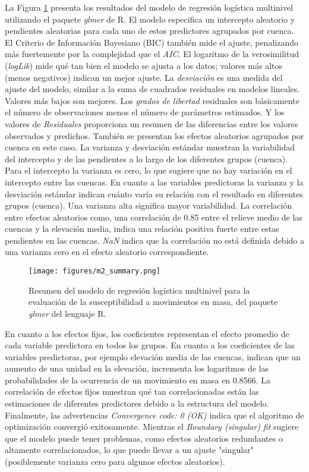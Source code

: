 \documentclass[
  manuscript=article,  
  layout=preprint,  
]{format}
\begin{document}
La Figura \ref{fig:m2-table} presenta los resultados del modelo de regresión logística multinivel utilizando el paquete \textit{glmer} de R. El modelo especifica un intercepto aleatorio y pendientes aleatorias para cada uno de estos predictores agrupados por cuenca.  El Criterio de Información Bayesiano (BIC) también mide el ajuste, penalizando más fuertemente por la complejidad que el \textit{AIC}. El logaritmo de la verosimilitud (\textit{logLik}) mide qué tan bien el modelo se ajusta a los datos; valores más altos (menos negativos) indican un mejor ajuste. La \textit{desviación} es una medida del ajuste del modelo, similar a la suma de cuadrados residuales en modelos lineales. Valores más bajos son mejores. Los \textit{grados de libertad} residuales son básicamente el número de observaciones menos el número de parámetros estimados. Y los valores de \textit{Residuales} proporciona un resumen de las diferencias entre los valores observados y predichos. También se presentan los efectos aleatorios agrupados por cuenca en este caso. La varianza y desviación estándar muestran la variabilidad del intercepto y de las pendientes a lo largo de los diferentes grupos (cuenca). Para el intercepto la varianza es cero, lo que sugiere que no hay variación en el intercepto entre las cuencas. En cuanto a las variables predictoras la varianza y la desviación estándar indican cuánto varía su relación con el resultado en diferentes grupos (cuenca). Una varianza alta significa mayor variabilidad. La correlación entre efectos aleatorios como, una correlación de 0.85 entre el relieve medio de las cuencas y la elevación media, indica una relación positiva fuerte entre estas pendientes en las cuencas. \textit{NaN} indica que la correlación no está definida debido a una varianza cero en el efecto aleatorio correspondiente.

\begin{figure}[ht!]
    \label{fig:m2-table}
    \centering
      {\texttt{[image: figures/m2\_summary.png]}}
\caption{Resumen del modelo de regresión logística multinivel para la evaluación de la susceptibilidad a movimientos en masa, del paquete \textit{glmer} del lenguaje R.}
\end{figure}

En cuanto a los efectos fijos, los coeficientes representan el efecto promedio de cada variable predictora en todos los grupos. En cuanto a los coeficientes de las variables predictoras, por ejemplo elevación media de las cuencas, indican que un aumento de una unidad en la elevación, incrementa los logaritmos de las probabilidades de la ocurrencia de un movimiento en masa en 0.8566. La correlación de efectos fijos muestran qué tan correlacionadas están las estimaciones de diferentes predictores debido a la estructura del modelo. Finalmente, las advertencias \textit{Convergence code: 0 (OK)} indica que el algoritmo de optimización convergió exitosamente. Mientras el \textit{Boundary (singular) fit} sugiere que el modelo puede tener problemas, como efectos aleatorios redundantes o altamente correlacionados, lo que puede llevar a un ajuste "singular" (posiblemente varianza cero para algunos efectos aleatorios).
\end{document}
